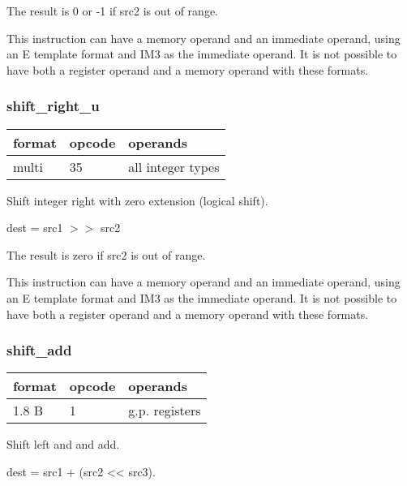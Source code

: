 \documentclass[forwardcom.tex]{subfiles}
\begin{document}
The result is 0 or -1 if src2 is out of range.
\vspace{2mm}

This instruction can have a memory operand and an immediate operand, using an E template format and IM3  as the immediate operand. It is not possible to have both a register operand and a memory operand with these formats.
\vspace{2mm}

\subsubsection{shift\_right\_u}
\label{table:shiftRightUInstruction}
\begin{tabular}{|p{12mm}|p{12mm}|p{110mm}|}
\hline
\bfseries format & \bfseries opcode & \bfseries operands \\ \hline
multi & 35 & all integer types \\ \hline
\end{tabular}
\vspace{2mm}

Shift integer right with zero extension (logical shift).

dest = src1 $>>$ src2
\vspace{2mm}

The result is zero if src2 is out of range.
\vspace{2mm}

This instruction can have a memory operand and an immediate operand, using an E template format and IM3  as the immediate operand. It is not possible to have both a register operand and a memory operand with these formats.
\vspace{2mm}

\subsubsection{shift\_add}
\label{table:shiftAddInstruction}
\begin{tabular}{|p{12mm}|p{12mm}|p{110mm}|}
\hline
\bfseries format & \bfseries opcode & \bfseries operands \\ \hline
1.8 B &  1 & g.p. registers \\ \hline
\end{tabular}
\vspace{2mm}

Shift left and and add. 
\vspace{2mm}

dest = src1 + (src2 \textless\textless{}  src3).
\vspace{2mm}
\end{document}

